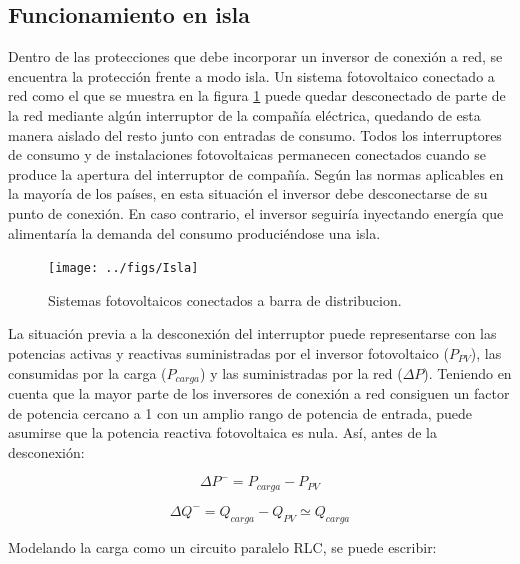 \subsection{Funcionamiento en isla}

Dentro de las protecciones que debe incorporar un inversor de conexión
a red, se encuentra la protección frente a modo isla. Un sistema fotovoltaico
conectado a red como el que se muestra en la figura \ref{fig:SistemasConectados}
puede quedar desconectado de parte de la red mediante algún interruptor
de la compañía eléctrica, quedando de esta manera aislado del resto
junto con entradas de consumo. Todos los interruptores de consumo
y de instalaciones fotovoltaicas permanecen conectados cuando se produce
la apertura del interruptor de compañía. Según las normas aplicables
en la mayoría de los países, en esta situación el inversor debe desconectarse
de su punto de conexión. En caso contrario, el inversor seguiría inyectando
energía que alimentaría la demanda del consumo produciéndose una isla. 

%
\begin{figure}
\begin{centering}
\texttt{[image: ../figs/Isla]}
\end{centering}

\caption{\label{fig:SistemasConectados}Sistemas fotovoltaicos conectados a
barra de distribucion.}

\end{figure}


La situación previa a la desconexión del interruptor puede representarse
con las potencias activas y reactivas suministradas por el inversor
fotovoltaico ($P_{PV}$), las consumidas por la carga ($P_{carga}$)
y las suministradas por la red ($\Delta P$). Teniendo en cuenta que
la mayor parte de los inversores de conexión a red consiguen un factor
de potencia cercano a 1 con un amplio rango de potencia de entrada,
puede asumirse que la potencia reactiva fotovoltaica es nula. Así,
antes de la desconexión:

\begin{equation}
\Delta P^{-}=P_{carga}-P_{PV}\end{equation}


\begin{equation}
\Delta Q^{-}=Q_{carga}-Q_{PV}\simeq Q_{carga}\end{equation}


Modelando la carga como un circuito paralelo RLC, se puede escribir:

